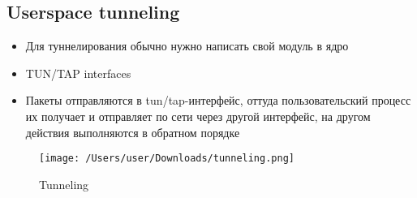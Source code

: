   \subsection{Userspace tunneling}
    \begin{itemize}
      \item Для туннелирования обычно нужно написать свой модуль в ядро
      \item TUN/TAP interfaces
      \item Пакеты отправляются в tun/tap-интерфейс, оттуда пользовательский процесс их получает и отправляет по сети через другой интерфейс, на другом действия выполняются в обратном порядке
    \end{itemize}
    
\begin{figure}[H]
  \centering
  \texttt{[image: /Users/user/Downloads/tunneling.png]}
  \caption{Tunneling}
  \label{fig:tunneling}
\end{figure}
